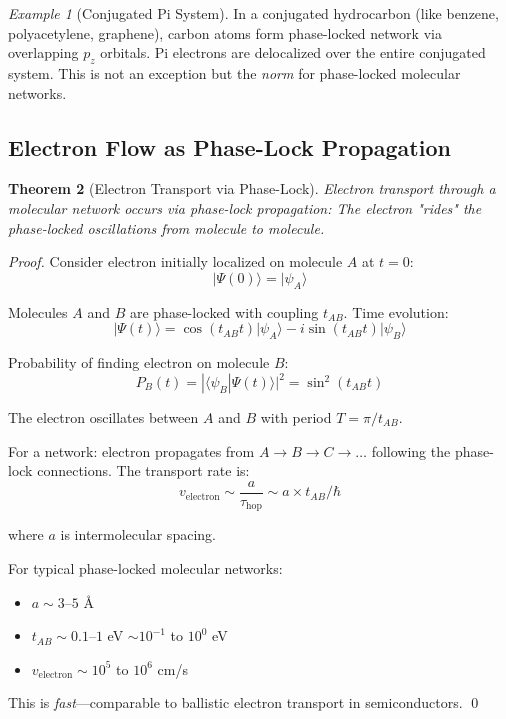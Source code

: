 \documentclass[11pt]{article}
\newtheorem{theorem}{Theorem}[section]
\theoremstyle{remark}
\newtheorem{example}[theorem]{Example}
\begin{document}
\begin{example}[Conjugated Pi System]
In a conjugated hydrocarbon (like benzene, polyacetylene, graphene), carbon atoms form phase-locked network via overlapping $p_z$ orbitals. Pi electrons are delocalized over the entire conjugated system. This is not an exception but the \textit{norm} for phase-locked molecular networks.
\end{example}

\subsection{Electron Flow as Phase-Lock Propagation}

\begin{theorem}[Electron Transport via Phase-Lock]
\label{thm:electron_transport}
Electron transport through a molecular network occurs via \textit{phase-lock propagation}: The electron "rides" the phase-locked oscillations from molecule to molecule.
\end{theorem}

\begin{proof}
Consider electron initially localized on molecule $A$ at $t=0$:
\begin{equation}
|\Psi(0)\rangle = |\psi_A\rangle
\end{equation}

Molecules $A$ and $B$ are phase-locked with coupling $t_{AB}$. Time evolution:
\begin{equation}
|\Psi(t)\rangle = \cos(t_{AB} t) |\psi_A\rangle - i \sin(t_{AB} t) |\psi_B\rangle
\end{equation}

Probability of finding electron on molecule $B$:
\begin{equation}
P_B(t) = |\langle \psi_B | \Psi(t) \rangle|^2 = \sin^2(t_{AB} t)
\end{equation}

The electron oscillates between $A$ and $B$ with period $T = \pi/t_{AB}$.

For a network: electron propagates from $A \to B \to C \to \ldots$ following the phase-lock connections. The transport rate is:
\begin{equation}
v_{\text{electron}} \sim \frac{a}{\tau_{\text{hop}}} \sim a \times t_{AB} / \hbar
\end{equation}

where $a$ is intermolecular spacing.

For typical phase-locked molecular networks:
\begin{itemize}
\item $a \sim 3$--$5$ Å
\item $t_{AB} \sim 0.1$--$1$ eV $\sim 10^{-1}$ to $10^{0}$ eV
\item $v_{\text{electron}} \sim 10^5$ to $10^6$ cm/s
\end{itemize}

This is \textit{fast}—comparable to ballistic electron transport in semiconductors. \qed
\end{proof}
\end{document}
